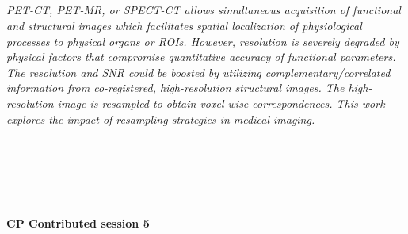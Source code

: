 \begin{multicols}{2}
        \\\\
        \\
        \\\\
        \\
        \\\\
\\
      \textit{PET-CT, PET-MR, or SPECT-CT allows simultaneous acquisition of functional and structural images which facilitates spatial localization of physiological processes to physical organs or ROIs. However, resolution is severely degraded by physical factors that compromise quantitative accuracy of functional parameters. The resolution and SNR could be boosted by utilizing complementary/correlated information from co-registered, high-resolution structural images. The high-resolution image is resampled to obtain voxel-wise correspondences. This work explores the impact of resampling strategies in medical imaging.}\\
\\ 
        \\
        \\\\
\\
\end{multicols}
  \noindent\textbf{CP Contributed session 5}\\
  \textit{} \\
    
